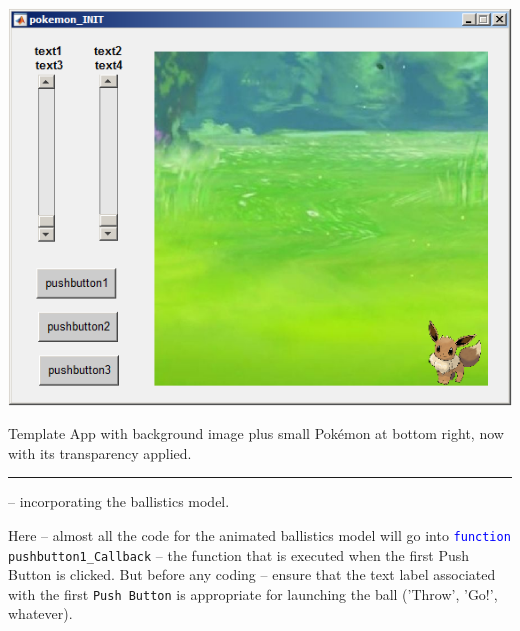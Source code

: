 \documentclass{tufte-book} %
\begin{document}
\begin{marginfigure}[0.0in]
\includegraphics[width=\linewidth]{chGUI-Pokemon5.png}
\caption{Template App with background image plus small Pok\'emon at bottom right, now with its transparency applied.}
\label{fig:chGUI-Pokemon5}
\end{marginfigure}

\vspace{1mm}
\noindent\rule{4cm}{0.5pt}
\vspace{-2mm}

 -- incorporating the ballistics model.

Here -- almost all the code for the animated  ballistics model will go into \texttt{\textcolor{blue}{function} pushbutton1\_Callback} -- the function that is executed when the first \textsf{Push Button} is clicked. But before any coding -- ensure that the text label associated with the first \texttt{Push Button} is appropriate for launching the ball ('Throw', 'Go!', whatever).
\end{document}
